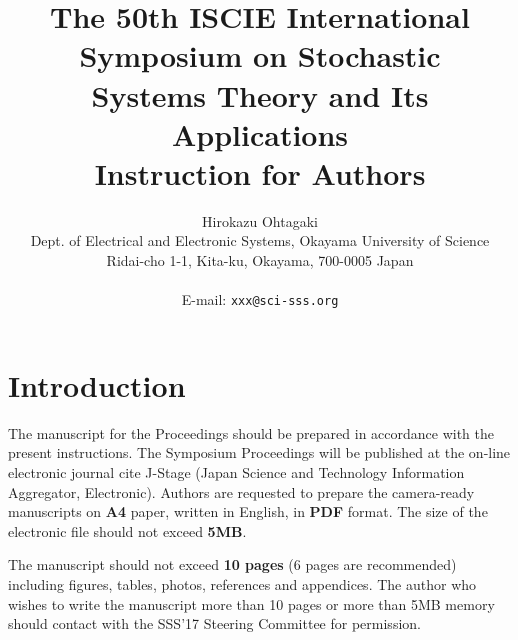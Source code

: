 \documentclass[a4paper]{article}
\begin{document}
\date{}
\title{\LARGE{\bf
The 50th ISCIE International Symposium on Stochastic\\
Systems Theory and Its Applications\\
Instruction for Authors}
}
\author{
Hirokazu Ohtagaki \\
Dept. of Electrical and Electronic Systems, Okayama University of Science\\
Ridai-cho 1-1, Kita-ku, Okayama, 700-0005 Japan\\
\\E-mail: \texttt{xxx@sci-sss.org}
}

\maketitle
\thispagestyle{empty}


\section{Introduction}

The manuscript for the Proceedings should be prepared in accordance with the present
instructions.
The Symposium Proceedings will be published at the on-line electronic journal cite 
J-Stage (Japan Science and Technology Information Aggregator, Electronic). 
Authors are requested to prepare the camera-ready manuscripts on {\bf A4} paper,
written in English, in {\bf PDF} format.
The size of the electronic file should not exceed {\bf 5MB}.

The manuscript should not exceed {\bf 10 pages} (6 pages are recommended) including
figures, tables, photos, references and appendices.
The author who wishes to write the manuscript more than 10 pages or more than 5MB
memory should contact with the SSS'17 Steering Committee for permission.
 
\end{document}
